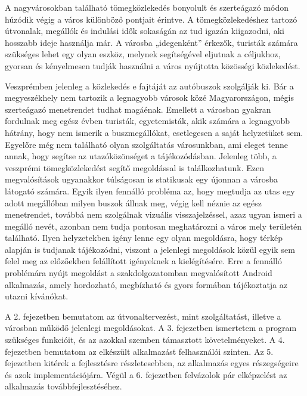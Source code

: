 
A nagyvárosokban található tömegközlekedés bonyolult és szerteágazó módon húzódik végig a város különböző pontjait érintve. 
A tömegközlekedéshez tartozó útvonalak, megállók és indulási idők sokaságán az tud igazán kiigazodni, aki hosszabb ideje használja már. 
A városba „idegenként” érkezők, turisták számára szükséges lehet egy olyan eszköz, melynek segítségével eljutnak a céljukhoz, gyorsan és kényelmesen tudják használni a város nyújtotta közösségi közlekedést. 

Veszprémben jelenleg a közlekedés e fajtáját az autóbuszok szolgálják ki. 
Bár a megyeszékhely nem tartozik a legnagyobb városok közé Magyarországon, mégis szerteágazó menetrendet tudhat magáénak. 
Emellett a városban gyakran fordulnak meg egész évben turisták, egyetemisták, akik számára a legnagyobb hátrány, hogy nem ismerik a buszmegállókat, esetlegesen a saját helyzetüket sem. 
Egyelőre még nem található olyan szolgáltatás városunkban, ami eleget tenne annak, hogy segítse az utazóközönséget a tájékozódásban.
Jelenleg több, a veszprémi tömegközlekedést segítő megoldással is találkozhatunk. 
Ezen megvalósítások ugyanakkor túlságosan is statikusak egy újonnan a városba látogató számára. 
Egyik ilyen fennálló probléma az, hogy megtudja az utas egy adott megállóban milyen buszok állnak meg, végig kell néznie az egész menetrendet, továbbá nem szolgálnak vizuális visszajelzéssel, azaz ugyan ismeri a megálló nevét, azonban nem tudja pontosan meghatározni a város mely területén található. 
Ilyen helyzetekben igény lenne egy olyan megoldásra, hogy térkép alapján is tudjanak tájékozódni, viszont a jelenlegi megoldások közül egyik sem felel meg az előzőekben felállított igényeknek a kielégítésére.
Erre a fennálló problémára nyújt megoldást a szakdolgozatomban megvalósított Android alkalmazás, amely hordozható, megbízható és gyors formában tájékoztatja az utazni kívánókat. %

A 2. fejezetben bemutatom az útvonaltervezést, mint szolgáltatást, illetve a városban működő jelenlegi megoldásokat. 
A 3. fejezetben ismertetem a program szükséges funkcióit, és az azokkal szemben támasztott követelményeket.
A 4. fejezetben bemutatom az elkészült alkalmazást felhasználói szinten.
Az 5. fejezetben kitérek a fejlesztésre részletesebben, az alkalmazás egyes részegségeire és azok implementációjára. 
Végül a 6. fejezetben felvázolok pár elképzelést az alkalmazás továbbfejlesztéséhez.
\newpage
